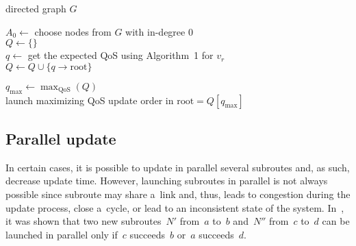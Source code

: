 \begin{multicols}{2}
\begin{algorithm*}
{directed graph $G$} 
 
 
 $A_0 \leftarrow$ choose nodes from $G$ with in-degree $0$ \\
 $Q \leftarrow \{\}$ \\
 
 \BlankLine
 {
 $q \leftarrow$ get the expected QoS using Algorithm~1 for $v_r$ \\
 $Q \leftarrow Q \cup \{q \rightarrow \mathrm{root} \}$ \\
 }

 \BlankLine
 $q_{\max} \leftarrow \max_{\mathrm{QoS}}(Q)$ \\
 launch maximizing QoS update order in $\mathrm{root}=Q[q_{\max}]$ \\ 
 
 
\end{algorithm*}



\vspace*{12pt}





\subsection{Parallel update}

\noindent
In certain cases, it is possible to update in parallel several subroutes 
and, as such, decrease update time. However, launching subroutes in parallel 
is not always possible
 since subroute may share a~link and, thus, leads to congestion 
during the update process, close a~cycle, or lead to an inconsistent state of the 
system. In~\cite{delaet_seamless_2015}, it was shown that two new subroutes~$N'$ 
from~$a$ to~$b$ and~$N''$ from~$c$ to~$d$ can be launched in parallel only if~$c$ 
succeeds~$b$ or~$a$ succeeds~$d$.




\end{multicols}
